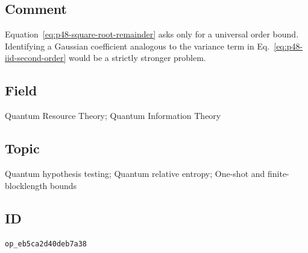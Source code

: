 \subsection*{Comment}

Equation~\eqref{eq:p48-square-root-remainder} asks only for a universal order
bound.  Identifying a Gaussian coefficient analogous to the variance term in
Eq.~\eqref{eq:p48-iid-second-order} would be a strictly stronger problem.

\subsection*{Field}

Quantum Resource Theory; Quantum Information Theory

\subsection*{Topic}

Quantum hypothesis testing; Quantum relative entropy; One-shot and finite-blocklength bounds

\subsection*{ID}

\texttt{op\_eb5ca2d40deb7a38}
